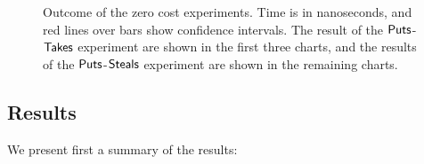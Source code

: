 \begin{figure}[!ht]
{  }

  \caption{\label{fig:zerocost} Outcome of the zero cost experiments. Time is in nanoseconds, and red lines over bars show confidence intervals.  The result of the ${\sf \small Puts}$-${\sf \small Takes}$ experiment are shown in the first three charts, and the results of the ${\sf \small Puts}$-${\sf \small Steals}$ experiment are shown in the remaining charts.}

\end{figure}

\subsection{Results\label{subsec-results}}



We present first a summary of the results:

